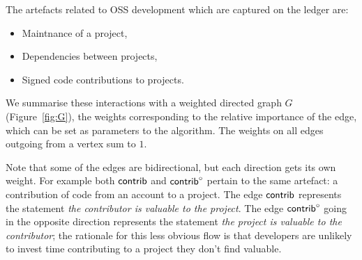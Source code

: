 The artefacts related to OSS development which are captured on the \oscoin{}
ledger are:
\begin{itemize}
  \item Maintnance of a project,
  \item Dependencies between projects,
  \item Signed code contributions to projects.
\end{itemize}
We summarise these interactions with a weighted directed graph $G$
(Figure~\ref{fig:G}), the weights corresponding to the relative importance of
the edge, which can be set as parameters to the algorithm.  The weights on all
edges outgoing from a vertex sum to $1$.

\begin{center}
\end{center}
\medskip


\noindent Note that some of the edges are bidirectional, but each direction gets
its own weight. For example both $\mathsf{contrib}$ and $\mathsf{contrib}^\circ$ pertain to
the same artefact: a contribution of code from an account to a
project. The edge $\mathsf{contrib}$ represents the statement \emph{the contributor
is valuable to the project}. The edge $\mathsf{contrib}^\circ$ going in the
opposite direction represents the statement \emph{the project is
valuable to the contributor}; the rationale for this less obvious flow is
that developers are unlikely to invest time contributing to a project they
don't find valuable.


